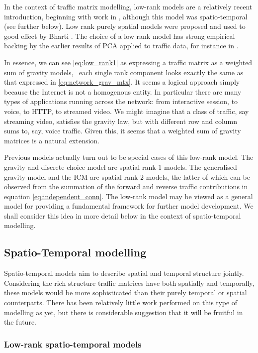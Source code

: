 In the context of traffic matrix modelling, low-rank models are a
relatively recent introduction, beginning with work in
\cite{Zhang09TMCS}, although this model was spatio-temporal
(see further below). Low rank purely spatial models were proposed
and used to good effect by Bharti \etal \cite{Bharti10Invisible}.
The choice of a low rank model has strong empirical backing by the
earlier results of PCA applied to traffic data, for instance in
\cite{Lakhina04TrafficStruct,Zhang05Anomography}. 


In essence, we can see \autoref{eq:low_rank1} as expressing a traffic
matrix as a weighted sum of gravity models, \ie~each single rank
component looks exactly the same as that expressed in
\autoref{eq:network_grav_mtx}. It seems a logical approach simply
because the Internet is not a homogenous entity. In particular there
are many types of applications running across the network: from
interactive session, to voice, to HTTP, to streamed video. We might
imagine that a class of traffic, say streaming video, satisfies the
gravity law, but with different row and column sums to, say, voice
traffic. Given this, it seems that a weighted sum of gravity matrices
is a natural extension. 

Previous models actually turn out to be special cases of this low-rank
model. The gravity and discrete choice model are spatial rank-1
models. The generalised gravity model and the ICM are 
spatial rank-2 models, the latter of which can be observed
from the summation of the forward and reverse traffic contributions in
equation \autoref{eq:independent_conn}. The low-rank model may be
viewed as a general model for providing a fundamental framework for
further model development.  We shall consider this idea in more detail
below in the context of spatio-temporal modelling.

\subsection{Spatio-Temporal modelling}

Spatio-temporal models aim to describe spatial and temporal structure
jointly. Considering the rich structure traffic matrices have both
spatially and temporally, these models would be more sophisticated
than their purely temporal or spatial counterparts. There has been
relatively little work performed on this type of modelling as yet, but
there is considerable suggestion that it will be fruitful in the
future. 

\subsubsection{Low-rank spatio-temporal models}

